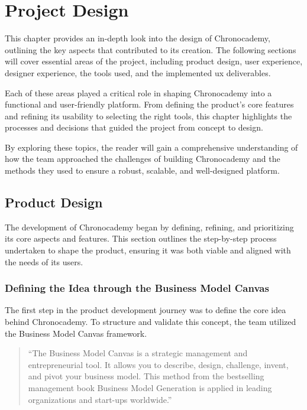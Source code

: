 \chapter{Project Design}\label{ch:project-design}

This chapter provides an in-depth look into the design of Chronocademy, outlining the key aspects that contributed to its creation.
The following sections will cover essential areas of the project, including product design, user experience, designer experience, the tools used, and the implemented ux deliverables.

Each of these areas played a critical role in shaping Chronocademy into a functional and user-friendly platform.
From defining the product's core features and refining its usability to selecting the right tools, this chapter highlights the processes and decisions that guided the project from concept to design.

By exploring these topics, the reader will gain a comprehensive understanding of how the team approached the challenges of building Chronocademy and the methods they used to ensure a robust, scalable, and well-designed platform.


\section{Product Design}\label{sec:product-design}
The development of Chronocademy began by defining, refining, and prioritizing its core aspects and features.
This section outlines the step-by-step process undertaken to shape the product, ensuring it was both viable and aligned with the needs of its users.

\subsection{Defining the Idea through the Business Model Canvas}\label{subsec:business-model-canvas}
The first step in the product development journey was to define the core idea behind Chronocademy.
To structure and validate this concept, the team utilized the Business Model Canvas framework.

\begin{quote}
    ``The Business Model Canvas is a strategic management and entrepreneurial tool.
    It allows you to describe, design, challenge, invent, and pivot your business model.
    This method from the bestselling management book Business Model Generation is applied in leading organizations and start-ups worldwide.''
\end{quote}\cite[Business Canvas Model]{business-canvas-model}

